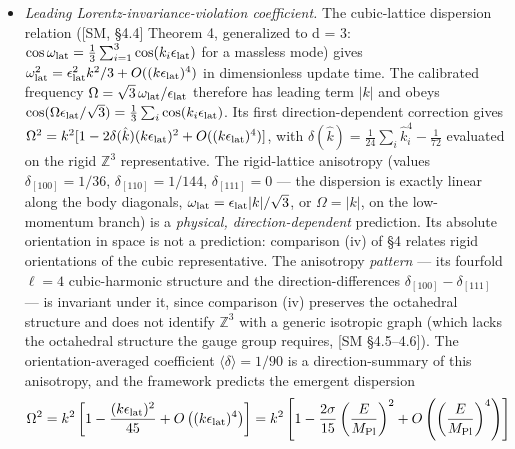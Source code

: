 \documentclass[
]{article}
\begin{document}
\begin{itemize}
  the framework's Bell-violating branch is ontically parameter-dependent
  {[}Main §3.3{]}. A confirmed loophole-free excess above \(2\sqrt2\)
  would falsify standard quantum mechanics and any claim that the
  operational lift lands in the standard quantum Bell set; it would not
  by itself falsify P-indivisibility. Bare C1--C4 or graph locality do
  not enforce Tsirelson.
\item
  \emph{Leading Lorentz-invariance-violation coefficient.} The
  cubic-lattice dispersion relation ({[}SM, §4.4{]} Theorem 4,
  generalized to d = 3:
  \(\cos\omega_{\mathrm{lat}} = \frac{1}{3}\sum_{i=1}^3 \cos(k_i \epsilon_{\rm lat})\)
  for a massless mode) gives
  \(\omega_{\mathrm{lat}}^2=\epsilon_{\rm lat}^2 k^2/3+O((k\epsilon_{\rm lat})^4)\)
  in dimensionless update time. The calibrated frequency
  \(\Omega=\sqrt{3}\,\omega_{\mathrm{lat}}/\epsilon_{\rm lat}\)
  therefore has leading term \(|k|\) and obeys
  \(\cos(\Omega\epsilon_{\rm lat}/\sqrt{3})=\frac{1}{3}\sum_i\cos(k_i\epsilon_{\rm lat})\).
  Its first direction-dependent correction gives
  \(\Omega^2 = k^2[1 - 2\delta(\hat k)(k\epsilon_{\rm lat})^2 + O((k\epsilon_{\rm lat})^4)]\),
  with \(\delta(\hat k) = \frac{1}{24}\sum_i \hat k_i^4 - \frac{1}{72}\)
  evaluated on the rigid \(\mathbb{Z}^3\) representative. The
  rigid-lattice anisotropy (values \(\delta_{[100]} = 1/36\),
  \(\delta_{[110]} = 1/144\), \(\delta_{[111]} = 0\) --- the dispersion
  is exactly linear along the body diagonals,
  \(\omega_{\mathrm{lat}}=\epsilon_{\rm lat}|k|/\sqrt{3}\), or
  \(\Omega=|k|\), on the low-momentum branch) is a \emph{physical,
  direction-dependent} prediction. Its absolute orientation in space is
  not a prediction: comparison (iv) of §4 relates rigid orientations of
  the cubic representative. The anisotropy \emph{pattern} --- its
  fourfold \(\ell=4\) cubic-harmonic structure and the
  direction-differences \(\delta_{[100]}-\delta_{[111]}\) --- is
  invariant under it, since comparison (iv) preserves the octahedral
  structure and does not identify \(\mathbb{Z}^3\) with a generic
  isotropic graph (which lacks the octahedral structure the gauge group
  requires, {[}SM §4.5--4.6{]}). The orientation-averaged coefficient
  \(\langle\delta\rangle = 1/90\) is a direction-summary of this
  anisotropy, and the framework predicts the emergent dispersion
  \[\Omega^2 = k^2\left[1 - \frac{(k\epsilon_{\rm lat})^2}{45} + O\left((k\epsilon_{\rm lat})^4\right)\right] = k^2\left[1 - \frac{2\sigma}{15}\left(\frac{E}{M_{\text{Pl}}}\right)^2 + O\left(\left(\frac{E}{M_{\text{Pl}}}\right)^4\right)\right]\]

\end{itemize}
\end{document}
